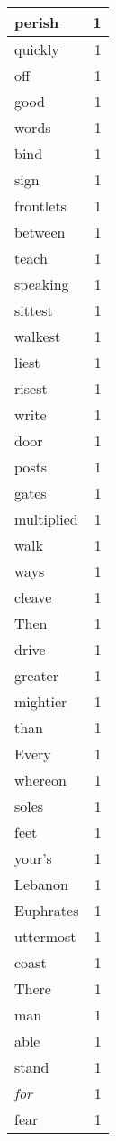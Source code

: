 \begin{center}
\begin{longtable}{l|r}
perish & 1 \\ \hline
quickly & 1 \\ \hline
off & 1 \\ \hline
good & 1 \\ \hline
words & 1 \\ \hline
bind & 1 \\ \hline
sign & 1 \\ \hline
frontlets & 1 \\ \hline
between & 1 \\ \hline
teach & 1 \\ \hline
speaking & 1 \\ \hline
sittest & 1 \\ \hline
walkest & 1 \\ \hline
liest & 1 \\ \hline
risest & 1 \\ \hline
write & 1 \\ \hline
door & 1 \\ \hline
posts & 1 \\ \hline
gates & 1 \\ \hline
multiplied & 1 \\ \hline
walk & 1 \\ \hline
ways & 1 \\ \hline
cleave & 1 \\ \hline
Then & 1 \\ \hline
drive & 1 \\ \hline
greater & 1 \\ \hline
mightier & 1 \\ \hline
than & 1 \\ \hline
Every & 1 \\ \hline
whereon & 1 \\ \hline
soles & 1 \\ \hline
feet & 1 \\ \hline
your's & 1 \\ \hline
Lebanon & 1 \\ \hline
Euphrates & 1 \\ \hline
uttermost & 1 \\ \hline
coast & 1 \\ \hline
There & 1 \\ \hline
man & 1 \\ \hline
able & 1 \\ \hline
stand & 1 \\ \hline
\emph{for} & 1 \\ \hline
fear & 1 \\ \hline

\end{longtable}
\end{center}
